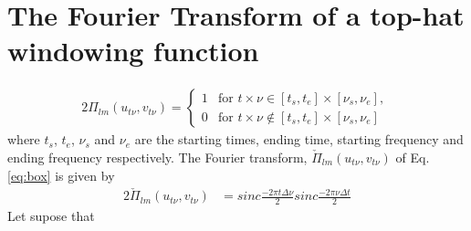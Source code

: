 
\section{The Fourier Transform of a top-hat windowing function} %
\label{AppendixA} %
\begin{alignat}{2}
\Pi_{lm}(u_{t\nu},v_{t\nu}) = \left\{
\begin{array}{rl}
1 & \mbox{for $\mathit{ t \times \nu \in  [t_s, t_e]\times [\nu_s, \nu_e]}$}, \\
0 & \mbox{for $\mathit{ t \times \nu  \notin [t_s, t_e]\times [\nu_s, \nu_e]}$ }
\end{array}\right.\label{eq:box}
\end{alignat}
where $t_s$, $t_e$, $\nu_s$ and $\nu_e$ are the starting times, ending time, starting frequency and ending frequency
 respectively. The Fourier transform, $\check{\Pi}_{lm}(u_{t\nu},v_{t\nu})$ of Eq.\ref{eq:box} is given by
\begin{alignat*}{2}
\check{\Pi}_{lm}(u_{t\nu},v_{t\nu})&=sinc\frac{-2\pi t\Delta \nu}{2}sinc\frac{-2\pi\nu\Delta t}{2}
\end{alignat*}
Let supose that 



